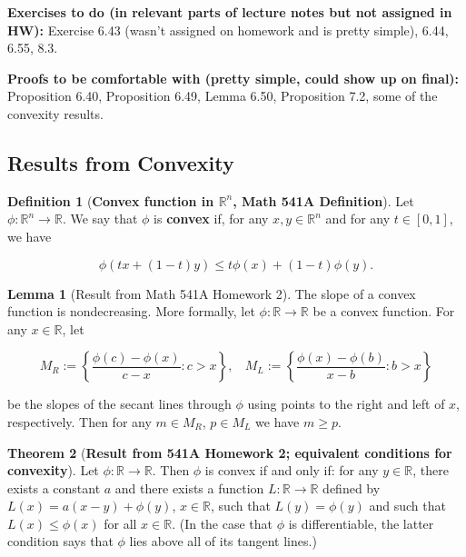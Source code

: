 \documentclass{article}
\theoremstyle{definition}
\newtheorem{theorem}{Theorem}
\theoremstyle{definition}
\theoremstyle{definition}
\newtheorem{lemma}[theorem]{Lemma}
\theoremstyle{definition}
\theoremstyle{definition}
\newtheorem{definition}{Definition}[section]
\theoremstyle{definition}
\theoremstyle{definition}
\begin{document}
\textbf{Exercises to do (in relevant parts of lecture notes but not assigned in HW):} Exercise 6.43 (wasn't assigned on homework and is pretty simple), 6.44, 6.55, 8.3.

\textbf{Proofs to be comfortable with (pretty simple, could show up on final):} Proposition 6.40, Proposition 6.49, Lemma 6.50, Proposition 7.2, some of the convexity results.

\subsection{Results from Convexity}

\begin{definition}[\textbf{Convex function in \(\mathbb{R}^n\), Math 541A Definition}]\label{cvx.defn.convex.multivar} Let $\phi:\mathbb{R}^n\to\mathbb{R}$.  We say that $\phi$ is \textbf{convex} if, for any $x,y\in\mathbb{R}^n$ and for any $t\in[0,1]$, we have

\begin{equation}\label{cvx.541a.hw6.5a}
\phi(tx+(1-t)y)\leq t\phi(x)+(1-t)\phi(y).
\end{equation}

\end{definition}

\begin{lemma}[Result from Math 541A Homework 2]\label{cvx.slope.nondec} The slope of a convex function is nondecreasing. More formally, let \(\phi: \mathbb{R} \to \mathbb{R}\) be a convex function. For any \(x \in \mathbb{R}\), let 

\[
M_R:= \left\{ \frac{\phi(c) - \phi(x) }{c-x}  : c > x \right\}, \ \ \ \ M_L:= \left\{ \frac{\phi(x) - \phi(b) }{x - b}  : b > x\right\}
\]

be the slopes of the secant lines through \(\phi\) using points to the right and left of \(x\), respectively. Then for any \(m \in M_R\), \(p \in M_L\) we have \(m \geq p\).

\end{lemma}

\begin{theorem}[\textbf{Result from 541A Homework 2; equivalent conditions for convexity}]\label{cvx.convex.tangent.line}
Let $\phi:\mathbb{R}\to\mathbb{R}$. Then $\phi$ is convex if and only if: for any $y\in\mathbb{R}$, there exists a constant $a$ and there exists a function $L:\mathbb{R}\to\mathbb{R}$ defined by $L(x)=a(x-y)+\phi(y)$, $x\in\mathbb{R}$, such that $L(y)=\phi(y)$ and such that $L(x)\leq\phi(x)$ for all $x\in\mathbb{R}$.  (In the case that $\phi$ is differentiable, the latter condition says that $\phi$ lies above all of its tangent lines.)
\end{theorem}
\end{document}
